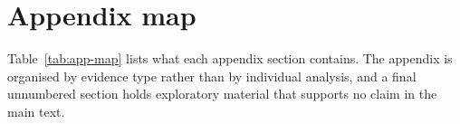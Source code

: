 \documentclass{article}
\newcommand{\ph}[1]{\textcolor{phgray}{\textsf{[\detokenize{#1}]}}}
\begin{document}






\appendix

\newpage



\section*{Appendix map}
\label{app:map}
Table~\ref{tab:app-map} lists what each appendix section contains. The appendix is organised
by evidence type rather than by individual analysis, and a final unnumbered section holds
exploratory material that supports no claim in the main text.
\end{document}
